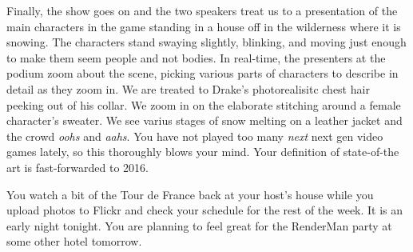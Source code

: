 \documentclass[../main.tex]{subfiles}
\begin{document}
Finally, the show goes on and the two speakers treat us to a presentation of the main characters in the game standing in a house off in the wilderness where it is snowing. The characters stand swaying slightly, blinking, and moving just enough to make them seem people and not bodies. In real-time, the presenters at the podium zoom about the scene, picking various parts of characters to describe in detail as they zoom in. We are treated to Drake's photorealisitc chest hair peeking out of his collar. We zoom in on the elaborate stitching around a female character's sweater. We see varius stages of snow melting on a leather jacket and the crowd \textit{oohs} and \textit{aahs}. You have not played too many \textit{next} next gen video games lately, so this thoroughly blows your mind. Your definition of state-of-the art is fast-forwarded to 2016.

You watch a bit of the Tour de France back at your host's house while you upload photos to Flickr and check your schedule for the rest of the week. It is an early night tonight. You are planning to feel great for the RenderMan party at some other hotel tomorrow.
\end{document}
